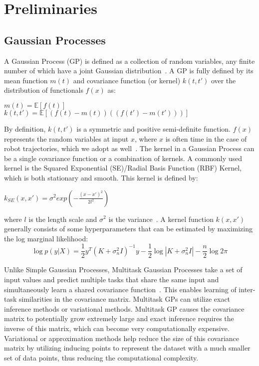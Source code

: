 \section{Preliminaries}

\subsection{Gaussian Processes}
A Gaussian Process (GP) is defined as a collection of random variables, any finite number of which have a joint Gaussian distribution~\cite{Rasmussen04book}.
A GP is fully defined by its mean function $m(t)$ and covariance function (or kernel) $k(t,t')$ over the distribution of functionals $f(x)$ as: 
\begin{center}$m(t)= \mathbb{E}[f(t)]$  \\
\medskip
$k(t,t') = \mathbb{E}[(f(t)  - m(t)) ((f(t')-m(t')))]$
\end{center} 
By definition, $k(t,t')$ is a symmetric and positive semi-definite function. $f(x)$ represents the random variables at input $x$, where $x$ is often time in the case of robot trajectories, which we adopt as well~\cite{Nguyen21arxiv}.
The kernel in a Gaussian Process can be a single covariance function or a combination of kernels. A commonly used kernel is the Squared Exponential (SE)/Radial Basis Function (RBF) Kernel, which is both stationary and smooth. This kernel is defined by:
\begin{center}
    $k_{SE}(x,x') = \sigma^2 exp(-\frac{(x-x')^2}{2l^2})$
\end{center}
where $l$ is the length scale and $\sigma^2$ is the variance~\cite{Duvenaud14thesis}. A kernel function $k(x,x')$ generally consists of some hyperparameters that can be estimated by maximizing the log marginal likelihood:
\[ \log{p(y|X)} = \frac{1}{2} y^{T} (K+\sigma_{n}^{2}I)^{-1}y - \frac{1}{2} \log |K+\sigma_{n}^{2}I| - \frac{n}{2} \log 2\pi\]

Unlike Simple Gaussian Processes, Multitask Gaussian Processes take a set of input values and predict multiple tasks that share the same input and simultaneously learn a shared covariance function~\cite{Bonilla07neurips}. This enables learning of inter-task similarities in the covariance matrix. Multitask GPs can utilize exact inference methods or variational methods. Multitask GP causes the covariance matrix to potentially grow extremely large and exact inference requires the inverse of this matrix, which can become very computationally expensive. Variational or approximation methods help reduce the size of this covariance matrix by utilizing inducing points to represent the dataset with a much smaller set of data points, thus reducing the computational complexity.

